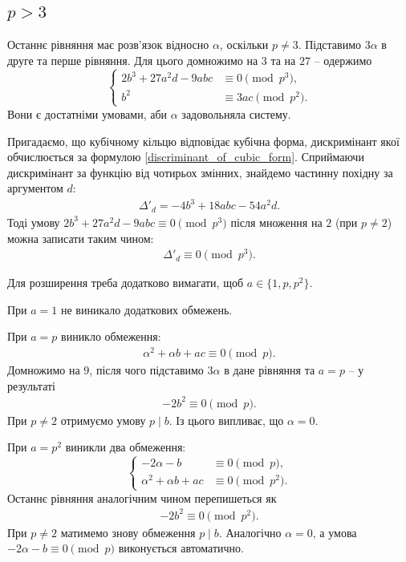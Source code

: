\documentclass{thesis}
\begin{document}
\subsection*{$p > 3$}
Останнє рівняння має розв'язок відносно $\alpha$, оскільки $p \neq 3$. Підставимо $3\alpha$ в друге та перше рівняння. Для цього домножимо на $3$ та на $27$ -- одержимо
\begin{equation*}
\begin{cases}
2b^3 + 27a^2 d - 9abc & \equiv 0 \pmod {p^3}, \\
b^2 & \equiv 3ac \pmod {p^2}.
\end{cases}
\end{equation*}
Вони є достатніми умовами, аби $\alpha$ задовольняла систему.

Пригадаємо, що кубічному кільцю відповідає кубічна форма, дискримінант якої обчислюється за формулою \eqref{discriminant_of_cubic_form}. Сприймаючи дискримінант за функцію від чотирьох змінних, знайдемо частинну похідну за аргументом $d$:
\begin{align*}
\Delta'_d = -4b^3 + 18 abc - 54a^2 d.
\end{align*}
Тоді умову $2b^3 + 27a^2d - 9abc \equiv 0 \pmod {p^3}$ після множення на $2$ (при $p \neq 2$) можна записати таким чином:
\begin{align*}
\Delta'_d \equiv 0 \pmod {p^3}.
\end{align*}

Для розширення треба додатково вимагати, щоб $a \in \{1,p,p^2\}$.

При $a = 1$ не виникало додаткових обмежень.

При $a = p$ виникло обмеження:
\begin{align*}
\alpha^2 + \alpha b + ac \equiv 0 \pmod p.
\end{align*}
Домножимо на $9$, після чого підставимо $3\alpha$ в дане рівняння та $a = p$ -- у результаті
\begin{align*}
-2b^2 \equiv 0 \pmod p.
\end{align*}
При $p \neq 2$ отримуємо умову $p \mid b$. Із цього випливає, що $\alpha = 0$.

При $a = p^2$ виникли два обмеження:
\begin{equation*}
\begin{cases}
-2\alpha - b & \equiv 0 \pmod p, \\
\alpha^2 + \alpha b + ac & \equiv 0 \pmod {p^2}.
\end{cases}
\end{equation*}
Останнє рівняння аналогічним чином перепишеться як
\begin{align*}
-2b^2 \equiv 0 \pmod {p^2}.
\end{align*}
При $p \neq 2$ матимемо знову обмеження $p \mid b$. Аналогічно $\alpha = 0$, а умова $-2\alpha - b \equiv 0 \pmod p$ виконується автоматично.
\end{document}
